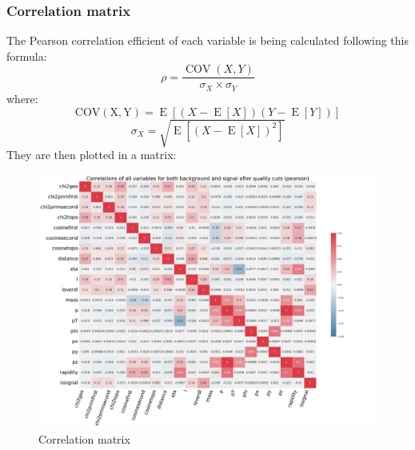 \subsubsection{Correlation matrix}
The Pearson correlation efficient of each variable is being calculated following this formula:
\begin{equation}
    \rho = \frac{\operatorname{COV}(X, Y)}{\sigma_X \times \sigma_Y}
\end{equation}
where:
\begin{equation}
    \operatorname{COV(X, Y)} = \operatorname{E}\left[\left(X - \operatorname{E}\left[X\right]\right) \left(Y - \operatorname{E}\left[Y\right]\right)\right]
\end{equation}
\begin{equation}
    \sigma_X = \sqrt{\operatorname{E}\left[\left(X - \operatorname{E}\left[X\right]\right)^2\right]}
    \label{stddev}
\end{equation}
They are then plotted in a matrix:
\begin{figure}[h!]
    \centering
    \includegraphics[width=1.1\textwidth]{img/Correlations_of_all_variables_for_both_background_and_signal_after_quality_cuts_(pearson).pdf}
    \caption{Correlation matrix}
\end{figure}
\clearpage
